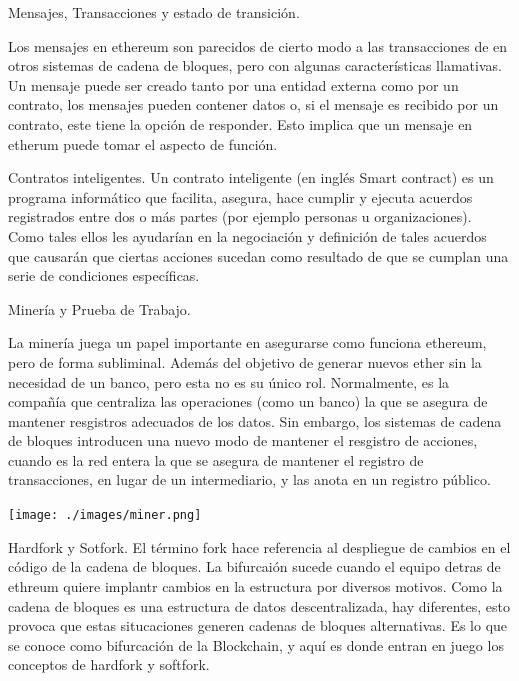 \documentclass[usenames,dvipsnames]{beamer}
\begin{document}
\begin{frame}{ Mensajes, Transacciones y estado de transición. }

Los mensajes en ethereum son parecidos de cierto modo a las transacciones de en otros  sistemas de cadena de bloques, pero  con algunas características llamativas. Un mensaje puede ser creado tanto por una entidad externa como por un contrato, los mensajes pueden contener datos o, si el mensaje es recibido por un contrato, este tiene la opción de responder. Esto implica que un mensaje en etherum puede tomar el aspecto de función.\\
\end{frame}


\begin{frame}{ Contratos inteligentes. }
Un contrato inteligente (en inglés Smart contract) es un programa informático que facilita, asegura, hace cumplir y ejecuta acuerdos registrados entre dos o más partes (por ejemplo personas u organizaciones). Como tales ellos les ayudarían en la negociación y definición de tales acuerdos que causarán que ciertas acciones sucedan como resultado de que se cumplan una serie de condiciones específicas.\\
\end{frame}

\begin{frame}{ Minería y Prueba de Trabajo. }
	
La minería juega un papel importante en asegurarse como funciona ethereum, pero de forma subliminal. Además del objetivo de generar nuevos ether sin la necesidad de un banco, pero esta no es su único rol. Normalmente, es la compañía que centraliza las operaciones (como un banco) la que se asegura de mantener resgistros adecuados de los datos. Sin embargo, los sistemas de cadena de bloques introducen una nuevo modo de mantener el resgistro de acciones, cuando es la red entera la que se asegura de mantener el registro de transacciones, en lugar de un intermediario, y las anota en un registro público.\\
\begin{center}
\hfill\texttt{[image: ./images/miner.png]}
\end{center}
\end{frame}

\begin{frame}{ Hardfork y Sotfork. }
El término fork hace referencia al despliegue de cambios en el código de la cadena de bloques. La bifurcaión sucede cuando el equipo detras de ethreum quiere implantr cambios en la estructura por diversos motivos. Como la cadena de bloques es una estructura de datos descentralizada, hay diferentes, esto provoca que estas situcaciones generen cadenas de bloques alternativas. Es lo que se conoce como bifurcación de la Blockchain, y aquí es donde entran en juego los conceptos de hardfork y softfork.\\
\end{frame}
\end{document}
